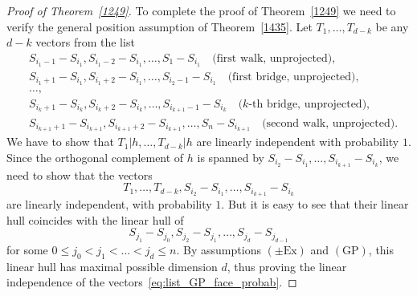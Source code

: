 \documentclass[12pt, reqno]{amsart}
\theoremstyle{plain}
\theoremstyle{definition}
\theoremstyle{remark}
\begin{document}
\begin{proof}[Proof of Theorem~\ref{1249}]
To complete the proof of  Theorem~\ref{1249} we need to verify the general position assumption of Theorem~\ref{1435}. Let $T_1,\ldots,T_{d-k}$ be any $d-k$ vectors from the list
\begin{align*}
&S_{i_1-1} - S_{i_1}, S_{i_1-2} - S_{i_1}, \ldots, S_{1} - S_{i_1}    \quad \text{(first walk, unprojected)}, \\
&S_{i_1+1} - S_{i_1}, S_{i_1+2} - S_{i_1}, \ldots,S_{i_2-1} - S_{i_1}    \quad \text{(first bridge, unprojected)}, \\
&\ldots,\\
&S_{i_k+1} - S_{i_k}, S_{i_k+2} - S_{i_k}, \ldots,S_{i_{k+1}-1} - S_{i_k}    \quad \text{($k$-th bridge, unprojected)}, \\
&S_{i_{k+1}+1} - S_{i_{k+1}}, S_{i_{k+1}+2} - S_{i_{k+1}}, \ldots,S_{n} - S_{i_{k+1}} \quad \text{(second walk, unprojected)}.
\end{align*}
We have to show that  $T_1|h,\ldots, T_{d-k}|h$ are linearly independent with probability $1$. Since the orthogonal complement of $h$ is spanned by $S_{i_2}-S_{i_1},\ldots, S_{i_{k+1}} - S_{i_k}$, we need to show that the vectors
\begin{equation}\label{eq:list_GP_face_probab}
T_1,\ldots,T_{d-k}, S_{i_2}-S_{i_1},\ldots, S_{i_{k+1}} - S_{i_k}
\end{equation}
are linearly independent, with probability $1$. But it is easy to see that their linear hull coincides with the linear hull of
$$
S_{j_1}-S_{j_0}, S_{j_2}-S_{j_1}, \ldots, S_{j_d}-S_{j_{d-1}}
$$
for some $0\leq j_0< j_1 < \ldots < j_d \leq n$. By assumptions $(\pm\text{Ex})$ and $(\text{GP})$, this linear hull has maximal possible dimension $d$, thus proving the linear independence of the vectors~\eqref{eq:list_GP_face_probab}.
\end{proof}
\end{document}

